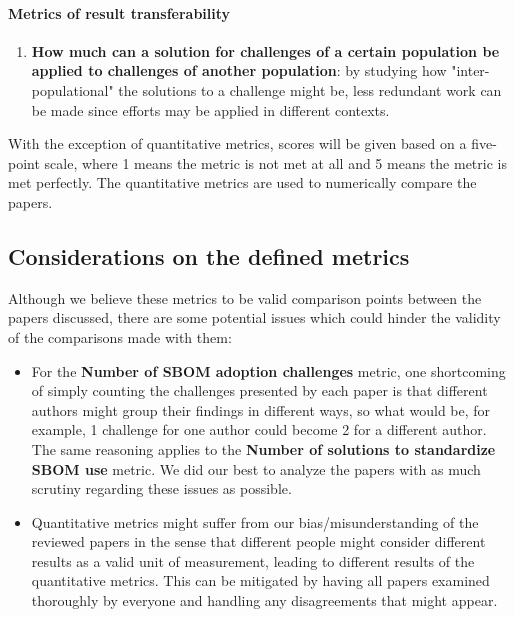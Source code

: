 \paragraph{Metrics of result transferability}
\begin{enumerate}
    \setcounter{enumi}{\value{metrics}}
    \item \textbf{How much can a solution for challenges of a certain population be applied to challenges of another population}: by studying how "inter-populational" the solutions to a challenge might be, less redundant work can be made since efforts may be applied in different contexts.
\end{enumerate}

\noindent With the exception of quantitative metrics, scores will be given based on a five-point scale, where 1 means the metric is not met at all and 5 means the metric is met perfectly. The quantitative metrics are used to numerically compare the papers.

\subsection{Considerations on the defined metrics}

\noindent Although we believe these metrics to be valid comparison points between the papers discussed, there are some potential issues which could hinder the validity of the comparisons made with them:
\begin{itemize}
    \item For the \textbf{Number of SBOM adoption challenges} metric, one shortcoming of simply counting the challenges presented by each paper is that different authors might group their findings in different ways, so what would be, for example, 1 challenge for one author could become 2 for a different author. The same reasoning applies to the \textbf{Number of solutions to standardize SBOM use} metric. We did our best to analyze the papers with as much scrutiny regarding these issues as possible.
    \item Quantitative metrics might suffer from our bias/misunderstanding of the reviewed papers in the sense that different people might consider different results as a valid unit of measurement, leading to different results of the quantitative metrics. This can be mitigated by having all papers examined thoroughly by everyone and handling any disagreements that might appear.
\end{itemize}